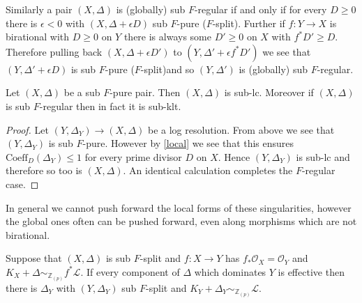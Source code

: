 \documentclass[a4paper,12pt]{book}
\newcommand{\ox}[1][X]{\mathcal{O}_{#1}}
\newcommand{\zp}{\mathbb{Z}_{(p)}}
\begin{document}
Similarly a pair $(X,\Delta)$ is (globally) sub $F$-regular if and only if for every $D \geq 0$ there is $\epsilon<0$ with $(X,\Delta+\epsilon D)$ sub $F$-pure ($F$-split). Further if $f:Y \to X$ is birational with $D \geq 0$ on $Y$ there is always some $D' \geq 0$ on $X$  with $f^{*}D' \geq D$. Therefore pulling back $(X,\Delta +\epsilon D')$ to $(Y,\Delta'+\epsilon f^{*}D')$ we see that  $(Y,\Delta'+\epsilon D)$ is sub $F$-pure ($F$-split)and so $(Y,\Delta')$ is (globally) sub $F$-regular.


\begin{theorem}
	
	Let $(X,\Delta)$ be a sub $F$-pure pair. Then $(X,\Delta)$ is sub-lc. Moreover if $(X,\Delta)$ is sub $F$-regular then in fact it is sub-klt.
	
\end{theorem}

\begin{proof}
		Let $(Y,\Delta_{Y}) \to (X,\Delta)$ be a log resolution. From above we see that $(Y,\Delta_{Y})$ is sub $F$-pure. However by \autoref{local} we see that this ensures $\text{Coeff}_{D}(\Delta_{Y}) \leq 1$ for every prime divisor $D$ on $X$. Hence $(Y,\Delta_{Y})$ is sub-lc and therefore so too is $(X,\Delta)$. An identical calculation completes the $F$-regular case.
\end{proof}

In general we cannot push forward the local forms of these singularities, however the global ones often can be pushed forward, even along morphisms which are not birational. 

\begin{lemma}
	Suppose that $(X,\Delta)$ is sub $F$-split and $f:X \to Y$ has $f_{*}\ox =\mathcal{O}_{Y}$ and $K_{X}+\Delta \sim_{\zp} f^{*}\mathcal{L}$. If every component of $\Delta$ which dominates $Y$ is effective then there is $\Delta_{Y}$ with $(Y,\Delta_{Y})$ sub $F$-split and $K_{Y}+\Delta_{Y} \sim_{\zp} \mathcal{L}$.
\end{lemma}
\end{document}
